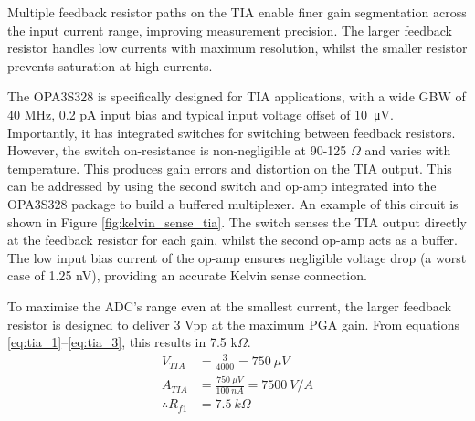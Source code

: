 Multiple feedback resistor paths on the \ac{TIA} enable finer gain segmentation across the input current range, improving measurement precision. The larger feedback resistor handles low currents with maximum resolution, whilst the smaller resistor prevents saturation at high currents. 

The OPA3S328 is specifically designed for \ac{TIA} applications, with a wide GBW of 40 MHz, 0.2 pA input bias and typical input voltage offset of \SI{10}{\micro\volt}. Importantly, it has integrated switches for switching between feedback resistors. However, the switch on-resistance is non-negligible at 90-125 $\Omega$ and varies with temperature. This produces gain errors and distortion on the \ac{TIA} output. This can be addressed by using the second switch and op-amp integrated into the OPA3S328 package to build a buffered multiplexer. An example of this circuit is shown in Figure \ref{fig:kelvin_sense_tia}. The switch senses the \ac{TIA} output directly at the feedback resistor for each gain, whilst the second op-amp acts as a buffer. The low input bias current of the op-amp ensures negligible voltage drop (a worst case of 1.25 nV), providing an accurate Kelvin sense connection.



To maximise the \ac{ADC}'s range even at the smallest current, the larger feedback resistor is designed to deliver 3 Vpp at the maximum \ac{PGA} gain. From equations \ref{eq:tia_1}--\ref{eq:tia_3}, this results in 7.5 k$\Omega$.
\begin{align}
        V_{TIA} &= \frac{3}{4000} = 750\ \mu V \label{eq:tia_1}\\
        A_{TIA} &= \frac{750\ \mu V}{100\ nA} = 7500\ V/A \\
        \therefore  R_{f1} &= 7.5\ k\Omega \label{eq:tia_3}
\end{align}


